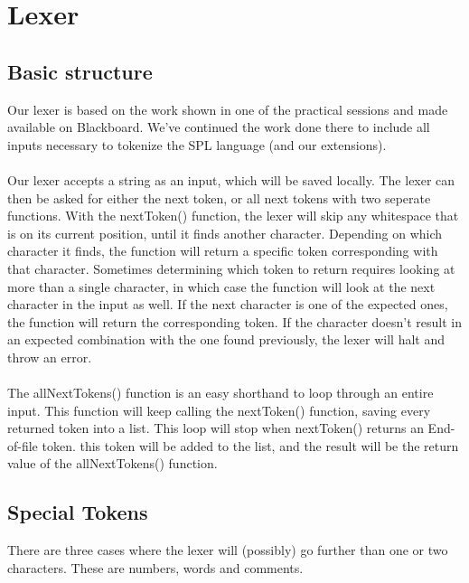 \documentclass[10pt,a4paper]{article}
\begin{document}
\section{Lexer}
\subsection{Basic structure}
Our lexer is based on the work shown in one of the practical sessions and made available on Blackboard. We've continued the work done there to include all inputs necessary to tokenize the SPL language (and our extensions). \\
\\
Our lexer accepts a string as an input, which will be saved locally. The lexer can then be asked for either the next token, or all next tokens with two seperate functions. With the nextToken() function, the lexer will skip any whitespace that is on its current position, until it finds another character. Depending on which character it finds, the function will return a specific token corresponding with that character. Sometimes determining which token to return requires looking at more than a single character, in which case the function will look at the next character in the input as well. If the next character is one of the expected ones, the function will return the corresponding token. If the character doesn't result in an expected combination with the one found previously, the lexer will halt and throw an error.\\
\\
The allNextTokens() function is an easy shorthand to loop through an entire input. This function will keep calling the nextToken() function, saving every returned token into a list. This loop will stop when nextToken() returns an End-of-file token. this token will be added to the list, and the result will be the return value of the allNextTokens() function.

\subsection{Special Tokens}
There are three cases where the lexer will (possibly) go further than one or two characters. These are numbers, words and comments.
\end{document}
